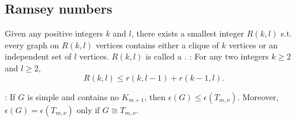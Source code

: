 \subsection{Ramsey numbers}
\bit
\w Given any positive integers $k$ and $l$, there exists a smallest integer
$R(k, l)$ s.t. every graph on $R(k, l)$ vertices contains either a clique of
$k$ vertices or an independent set of $l$ vertices. $R(k, l)$ is called a
. 
\w {}: 
   For any two integers $k \ge 2$ and $l \ge 2$,
   \[ R(k, l) \le r(k, l-1) + r(k-1, l).\]

\w {}: If $G$ is simple and contains no $K_{m+1}$, then
$\epsilon(G) \le \epsilon(T_{m,\nu})$. Moreover, $\epsilon(G) =
  \epsilon(T_{m, \nu})$ only if $G \cong T_{m, \nu}$. 
\eit


